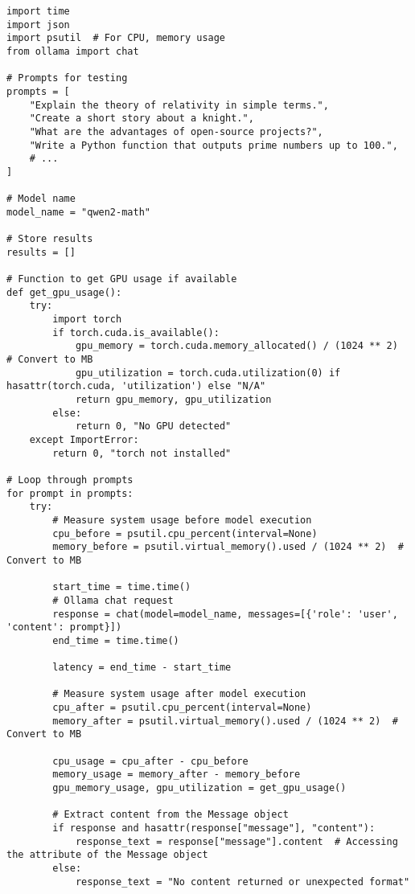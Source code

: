 \begin{lstlisting}[style=Python, caption={Python-quantitative-data-collection}, captionpos=b]
import time
import json
import psutil  # For CPU, memory usage
from ollama import chat

# Prompts for testing
prompts = [
    "Explain the theory of relativity in simple terms.",
    "Create a short story about a knight.",
    "What are the advantages of open-source projects?",
    "Write a Python function that outputs prime numbers up to 100.",
    # ...
]

# Model name
model_name = "qwen2-math"

# Store results
results = []

# Function to get GPU usage if available
def get_gpu_usage():
    try:
        import torch
        if torch.cuda.is_available():
            gpu_memory = torch.cuda.memory_allocated() / (1024 ** 2)  # Convert to MB
            gpu_utilization = torch.cuda.utilization(0) if hasattr(torch.cuda, 'utilization') else "N/A"
            return gpu_memory, gpu_utilization
        else:
            return 0, "No GPU detected"
    except ImportError:
        return 0, "torch not installed"

# Loop through prompts
for prompt in prompts:
    try:
        # Measure system usage before model execution
        cpu_before = psutil.cpu_percent(interval=None)
        memory_before = psutil.virtual_memory().used / (1024 ** 2)  # Convert to MB

        start_time = time.time()
        # Ollama chat request
        response = chat(model=model_name, messages=[{'role': 'user', 'content': prompt}])
        end_time = time.time()

        latency = end_time - start_time

        # Measure system usage after model execution
        cpu_after = psutil.cpu_percent(interval=None)
        memory_after = psutil.virtual_memory().used / (1024 ** 2)  # Convert to MB

        cpu_usage = cpu_after - cpu_before
        memory_usage = memory_after - memory_before
        gpu_memory_usage, gpu_utilization = get_gpu_usage()

        # Extract content from the Message object
        if response and hasattr(response["message"], "content"):
            response_text = response["message"].content  # Accessing the attribute of the Message object
        else:
            response_text = "No content returned or unexpected format"


\end{lstlisting}
